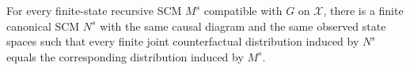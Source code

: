 For every finite-state recursive SCM \(M^s\) compatible with \(G\) on \(\mathcal X\), there is a finite canonical SCM \(N^s\) with the same causal diagram and the same observed state spaces such that every finite joint counterfactual distribution induced by \(N^s\) equals the corresponding distribution induced by \(M^s\).